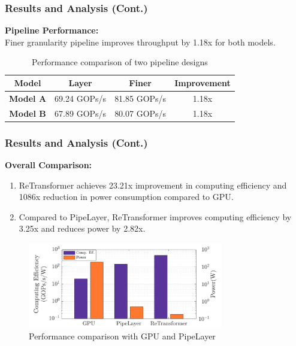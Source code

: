 \documentclass[
	12pt, %
]{beamer}
\begin{document}
\begin{frame}
	\frametitle{Results and Analysis (Cont.)}
	\textbf{Pipeline Performance:}\\
	Finer granularity pipeline improves throughput by 1.18x for both models.
	
	\begin{table}[h]
		\centering
		\begin{tabular}{c|c|c|c}
			\hline
			\textbf{Model} & \textbf{Layer} & \textbf{Finer} & \textbf{Improvement} \\
			\hline
			\textbf{Model A} & 69.24 GOPs/s & 81.85 GOPs/s & 1.18x \\ \hline
			\textbf{Model B}& 67.89 GOPs/s & 80.07 GOPs/s & 1.18x \\
			\hline
		\end{tabular}
		\caption{Performance comparison of two pipeline designs}
	\end{table}
\end{frame}



\begin{frame}
	\frametitle{Results and Analysis (Cont.)}
	\textbf{Overall Comparison:}\\
	
	\begin{enumerate}
		\item ReTransformer achieves 23.21x improvement in computing efficiency and 1086x reduction in power consumption compared to GPU.
		
		\item Compared to PipeLayer, ReTransformer improves computing efficiency by 3.25x and reduces power by 2.82x.
		
		
	\end{enumerate}
	
	\begin{figure}
		\includegraphics[width=8.5cm]{Images/img8.png}
		\caption{Performance comparison with GPU and PipeLayer}
	\end{figure}
\end{frame}


\end{document}
